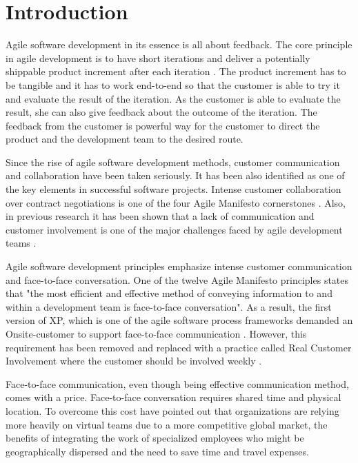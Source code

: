\documentclass[english,12pt,a4paper,pdftex]{article}
\begin{document}
\section{Introduction}

Agile software development in its essence is all about feedback. The core principle in agile development is to have short iterations and deliver a potentially shippable product increment after each iteration \citep{schwaber2009agile}. The product increment has to be tangible and it has to work end-to-end so that the customer is able to try it and evaluate the result of the iteration. As the customer is able to evaluate the result, she can also give feedback about the outcome of the iteration. The feedback from the customer is powerful way for the customer to direct the product and the development team to the desired route.

Since the rise of agile software development methods, customer communication and collaboration have been taken seriously. It has been also identified as one of the key elements in successful software projects. Intense customer collaboration over contract negotiations is one of the four Agile Manifesto cornerstones \citep{agilemanifesto}. Also, in previous research it has been shown that a lack of communication and customer involvement is one of the major challenges faced by agile development teams \citep{korkala2006}.

Agile software development principles emphasize intense customer communication and face-to-face conversation. One of the twelve Agile Manifesto principles states that "the most efficient and effective method of conveying information to and within a development team is face-to-face conversation". \citep{agilemanifesto} As a result, the first version of \ac{XP}, which is one of the agile software process frameworks demanded an Onsite-customer to support face-to-face communication \citep{beck2004}. However, this requirement has been removed and replaced with a practice called Real Customer Involvement where the customer should be involved weekly \citep{korkala2006}.

Face-to-face communication, even though being effective communication method, comes with a price. Face-to-face conversation requires shared time and physical location. To overcome this cost \citet{derosa2004} have pointed out that organizations are relying more heavily on virtual teams due to a more competitive global market, the benefits of integrating the work of specialized employees who might be geographically dispersed and the need to save time and travel expenses. 
\end{document}
